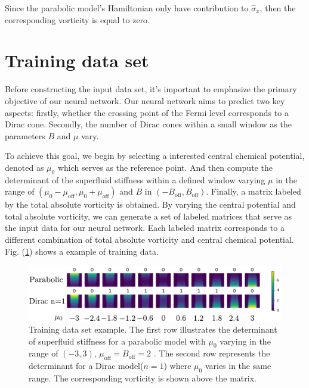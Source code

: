 \documentclass{article}
\begin{document}
Since the parabolic model's Hamiltonian only have contribution to $ \hat{\sigma}_x $, then the corresponding vorticity is equal to zero. 

\section{Training data set}
Before constructing the input data set, it's important to emphasize the primary objective of our neural network. Our neural network aims to predict two key aspects: firstly, whether the crossing point of the Fermi level corresponds to a Dirac cone. Secondly, the number of Dirac cones within a small window as the parameters $ B $ and $ \mu $ vary.

To achieve this goal, we begin by selecting a interested central chemical potential, denoted as $ \mu_0 $ which serves as the reference point. And then compute the determinant of the superfluid stiffness within a defined window varying $ \mu $ in the range of $ \left(\mu_0 - \mu_{\textrm{off}},\mu_0+ \mu_{\textrm{off} }   \right)$ and $ B $ in $ \left(-B_{\textrm{off}},B_{\textrm{off}}  \right) $. Finally, a matrix labeled by the total absolute vorticity is obtained. By varying the central potential and total absolute vorticity, we can generate a set of labeled matrices that serve as the input data for our neural network. Each labeled matrix corresponds to a different combination of total absolute vorticity and central chemical potential. Fig. (\ref{fig: Training Data}) shows a example of training data.

\begin{figure}[H]
    \centering
    \includegraphics[width=1\textwidth]{Training Data.pdf}
    \caption{Training data set example. The first row illustrates the determinant of superfluid stiffness for a parabolic model with $ \mu_0 $ varying in the range of $ \left(-3,3\right) $, $  \mu_{\textrm{off}} = B_{\textrm{off}} = 2$  . The second row represents the determinant for a Dirac model($ n=1 $) where $ \mu_0 $ varies in the same range. The corresponding vorticity is shown above the matrix.}
    \label{fig: Training Data}
\end{figure}
\end{document}
